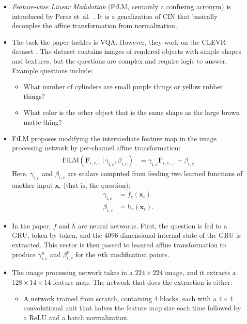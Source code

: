 \documentclass[10pt]{article}
\newcommand{\ve}[1]{\mathbf{#1}}
\newcommand{\etal}{{et~al.}}
\begin{document}
  \begin{itemize}
  	\item \emph{Feature-wise Linear Modulation} (FiLM, centainly a confusing acronym) is introduced by Perez \etal~\cite{Perez:2017}. It is a genalization of CIN that basically decouples the affine transformation from normalization.

  	\item The task the paper tackles is VQA. However, they work on the CLEVR dataset \cite{Johnson:2016}. The dataset contains images of rendered objects with simple shapes and textures, but the questions are complex and require logic to answer. Example questions include:
  	\begin{itemize}
  		\item What   number of cylinders are small purple things or yellow rubber things?
  		\item What color is the other object that is the same shape as the large brown matte thing?
  	\end{itemize}

  	\item FiLM proposes modifying the intermediate feature map in the image processing network by per-channel affine transformation:
  	\begin{align*}
  		\mathrm{FiLM}(\ve{F}_{i,c,\cdot,\cdot} | \gamma_{i,c}, \beta_{i,c})
  		&= \gamma_{i,c} \ve{F}_{i,c,\cdot,\cdot} + \beta_{i,c}
  	\end{align*}
  	Here, $\gamma_{i,c}$ and $\beta_{i,c}$ are scalars computed from feeding two learned functions of another input $\ve{x}_i$ (that is, the question):
  	\begin{align*}
  		\gamma_{i,c} &= f_c(\ve{x}_i) \\
  		\beta_{i,c} &= h_c(\ve{x}_i).
  	\end{align*}

  	\item In the paper, $f$ and $h$ are neural networks. First, the question is fed to a GRU, token by token, and the $4096$-dimensional internal state of the GRU is extracted. This vector is then passed to leanred affine transformation to produce $\gamma^n_{i,c}$ and $\beta^n_{i,c}$ for the $n$th modification points.

  	\item The image processing network takes in a $224 \times 224$ image, and it extracts a $128 \times 14 \times 14$ feature map. The network that does the extraction is either:
  	\begin{itemize}
  		\item A network trained from scratch, containing 4 blocks, each with a $4 \times 4$ convolutional unit that halves the feature map size each time followed by a ReLU and a batch normalization.


\end{itemize}
\end{itemize}
\end{document}
